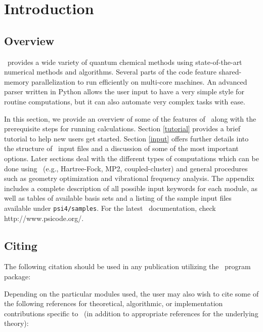 \section{Introduction} \label{introduction}

\subsection{Overview} 

\PSIfour\ provides a wide variety of quantum chemical methods using
state-of-the-art numerical methods and algorithms.  Several parts of
the code feature shared-memory parallelization to run efficiently on
multi-core machines.  An advanced parser written in Python allows the user
input to have a very simple style for routine computations, but it can also
automate very complex tasks with ease. 

In this section, we provide an overview of
some of the features of \PSIfour\ along with the prerequisite steps for
running calculations.  Section \ref{tutorial} provides a brief tutorial to
help new users get started.  Section \ref{input} offers further details
into the structure of \PSIfour\ input files and a discussion of some of
the most important options.  Later sections deal with the different types
of computations which can be done using \PSIfour\ (e.g., Hartree-Fock,
MP2, coupled-cluster) and general procedures such as geometry optimization
and vibrational frequency analysis.  The appendix includes a complete
description of all possible input keywords for each module,
as well as tables of available basis sets and a listing of the sample input
files available under {\tt psi4/samples}.
For the latest \PSIfour\ documentation, check  {http://www.psicode.org/}.

\subsection{Citing \PSIfour}

The following citation should be used in any publication utilizing the
\PSIfour\ program package:

\begin{quotation}
\noindent

\end{quotation}

Depending on the particular modules used, the user may also wish to
cite some of the following references for theoretical, algorithmic,
or implementation contributions specific to \PSIfour\ (in addition to
appropriate references for the underlying theory):

